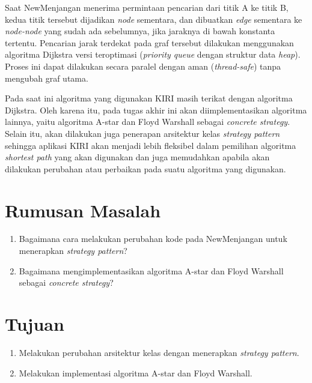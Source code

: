 Saat NewMenjangan menerima permintaan pencarian dari titik A ke titik B, kedua titik tersebut dijadikan \textit{node} sementara, dan dibuatkan \textit{edge} sementara ke \textit{node-node} yang sudah ada sebelumnya, jika jaraknya di bawah konstanta tertentu. Pencarian jarak terdekat pada graf tersebut dilakukan menggunakan algoritma Dijkstra versi teroptimasi (\textit{priority queue} dengan struktur data \textit{heap}). Proses ini dapat dilakukan secara paralel dengan aman (\textit{thread-safe}) tanpa mengubah graf utama.

Pada saat ini algoritma yang digunakan KIRI masih terikat dengan algoritma Dijkstra. Oleh karena itu, pada tugas akhir ini akan diimplementasikan algoritma lainnya, yaitu algoritma A-star dan Floyd Warshall sebagai \textit{concrete strategy}. Selain itu, akan dilakukan juga penerapan arsitektur kelas \textit{strategy pattern} sehingga aplikasi KIRI akan menjadi lebih fleksibel dalam pemilihan algoritma \textit{shortest path} yang akan digunakan dan juga memudahkan apabila akan dilakukan perubahan atau perbaikan pada suatu algoritma yang digunakan.

\section{Rumusan Masalah}
\label{sec:rumusan}
	\begin{enumerate}
                \item Bagaimana cara melakukan perubahan kode pada NewMenjangan untuk menerapkan \textit{strategy pattern}?
                \item Bagaimana mengimplementasikan algoritma A-star dan Floyd Warshall sebagai \textit{concrete strategy}?
	\end{enumerate}


\section{Tujuan}
\label{sec:tujuan}
	\begin{enumerate}
                \item Melakukan perubahan arsitektur kelas dengan menerapkan \textit{strategy pattern}.
                \item Melakukan implementasi algoritma A-star dan Floyd Warshall.
            \end{enumerate}



